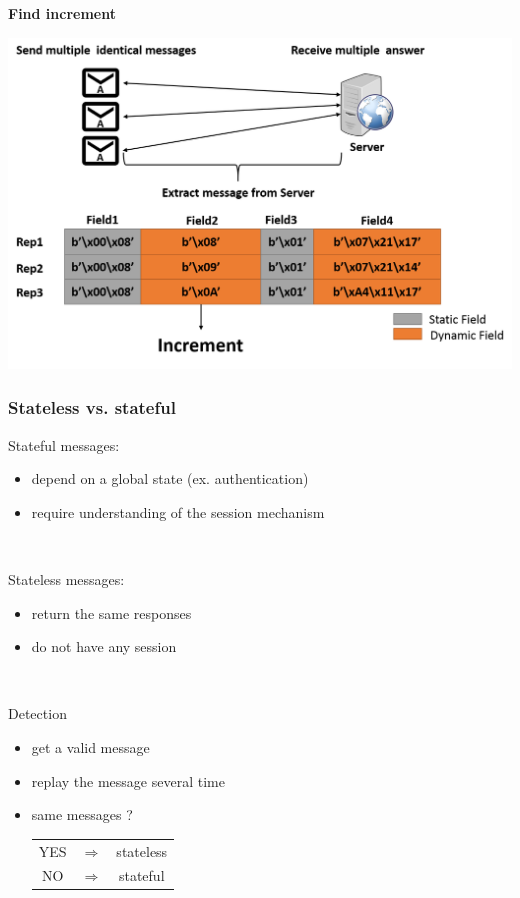 \documentclass{beamer}
\newcounter{m} %
\newcounter{c} %
\begin{document}
\begin{frame}{\bf Find increment}
\begin{center}
\includegraphics[scale=0.3]{incrementation.png}
\end{center}
\end{frame}

\begin{frame}\frametitle{Stateless vs. stateful}

  Stateful messages:
  \begin{itemize}
    \item depend on a global state (ex. authentication)
    \item require understanding of the session mechanism
  \end{itemize}

  ~

  Stateless messages: 
  \begin{itemize}
    \item return the same responses
    \item do not have any session
  \end{itemize}

  ~

  \begin{block}{Detection}
    \begin{itemize}
      \item get a valid message
      \item replay the message several time
      \item same messages ? \begin{tabular}{ccc}YES &$\Rightarrow$& stateless\\NO &$\Rightarrow$& stateful\end{tabular}
    \end{itemize}
  \end{block}
\end{frame}
\end{document}
